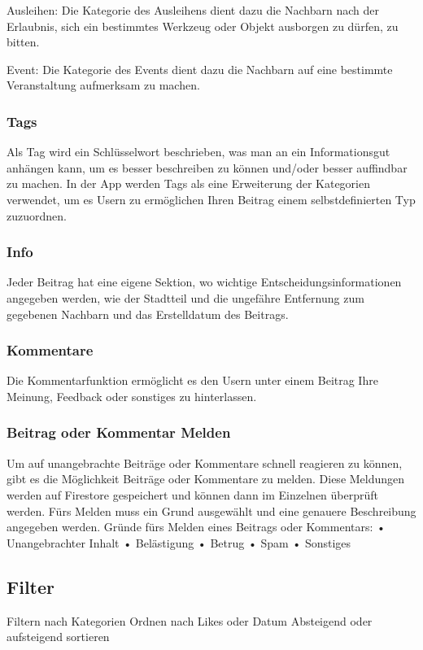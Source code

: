 Ausleihen:
Die Kategorie des Ausleihens dient dazu die Nachbarn nach der Erlaubnis, sich ein bestimmtes Werkzeug oder Objekt ausborgen zu dürfen, zu bitten.

Event:
Die Kategorie des Events dient dazu die Nachbarn auf eine bestimmte Veranstaltung aufmerksam zu machen.


\subsubsection{Tags}
Als Tag wird ein Schlüsselwort beschrieben, was man an ein Informationsgut anhängen kann, um es besser beschreiben zu können und/oder besser auffindbar zu machen. In der App werden Tags als eine Erweiterung der Kategorien verwendet, um es Usern zu ermöglichen Ihren Beitrag einem selbstdefinierten Typ zuzuordnen.

\subsubsection{Info}
Jeder Beitrag hat eine eigene Sektion, wo wichtige Entscheidungsinformationen angegeben werden, wie der Stadtteil und die ungefähre Entfernung zum gegebenen Nachbarn und das Erstelldatum des Beitrags.

\subsubsection{Kommentare}
Die Kommentarfunktion ermöglicht es den Usern unter einem Beitrag Ihre Meinung, Feedback oder sonstiges zu hinterlassen.

\subsubsection{Beitrag oder Kommentar Melden}
Um auf unangebrachte Beiträge oder Kommentare schnell reagieren zu können, gibt es die Möglichkeit Beiträge oder Kommentare zu melden. Diese Meldungen werden auf Firestore gespeichert und können dann im Einzelnen überprüft werden. Fürs Melden muss ein Grund ausgewählt und eine genauere Beschreibung angegeben werden.
Gründe fürs Melden eines Beitrags oder Kommentars:
•	Unangebrachter Inhalt
•	Belästigung
•	Betrug
•	Spam
•	Sonstiges

\subsection{Filter}
Filtern nach Kategorien
Ordnen nach Likes oder Datum
Absteigend oder aufsteigend sortieren

